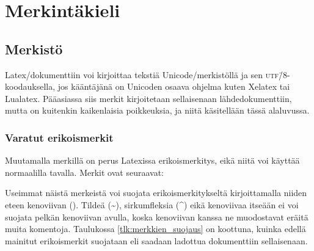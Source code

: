 \chapter{Merkintäkieli}


\section{Merkistö}

Latex\-/dokumenttiin voi kirjoittaa tekstiä Unicode\-/merkistöllä ja sen
\textsc{utf}\=/8\/-koodauksella, jos kääntäjänä on Unicoden osaava
ohjelma kuten Xelatex tai Lualatex. Pääasiassa siis merkit kirjoitetaan
sellaisenaan lähdedokumenttiin, mutta on kuitenkin kaikenlaisia
poikkeuksia, ja niitä käsitellään tässä alaluvussa.

\subsection{Varatut erikoismerkit}

Muutamalla merkillä on perus Latexissa erikoismerkitys, eikä niitä voi
käyttää normaalilla tavalla. Merkit ovat seuraavat:

\begin{koodilohkosis}
\end{koodilohkosis}

Useimmat näistä merkeistä voi suojata erikoismerkitykseltä
kirjoittamalla niiden eteen kenoviivan (\keno). Tildeä
(\textasciitilde), sirkumfleksia (\textasciicircum) eikä kenoviivaa
itseään ei voi suojata pelkän kenoviivan avulla, koska kenoviivan kanssa
ne muodostavat eräitä muita komentoja. Taulukossa
\ref{tlk:merkkien_suojaus} on koottuna, kuinka edellä mainitut
erikoismerkit suojataan eli saadaan ladottua dokumenttiin sellaisenaan.

